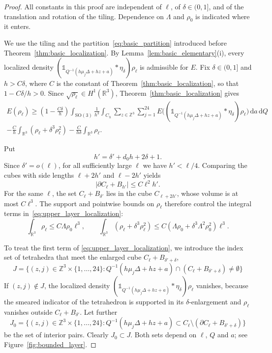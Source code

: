 \documentclass[final,reqno]{amsart}
\theoremstyle{remark}
\theoremstyle{definition}
\renewcommand{\le}{\leqslant}
\renewcommand{\ge}{\geqslant}
\newcommand{\RR}{\mathbb{R}}
\newcommand{\ZZ}{\mathbb{Z}}
\newcommand{\iden}{\mathbb{1}}
\newcommand{\tetra}{\mathbb{\Delta}}
\begin{document}
\begin{proof}
All constants in this proof are independent of $\ell$, of $\delta\in(0,1]$, and of the translation and rotation of the tiling. Dependence on $\Lambda$ and $\rho_0$ is indicated where it enters.

We use the tiling and the partition~\eqref{eq:basic_partition} introduced before Theorem~\ref{thm:basic_localization}. By Lemma~\ref{lem:basic_elementary}(i), every localized density $(\iden_{Q^{-1}(h\mu_j\tetra+h z+a)}*\eta_\delta)\rho_\ell$ is admissible for $E$. Fix $\delta\in(0,1]$ and $h>C\delta$, where $C$ is the constant of Theorem~\ref{thm:basic_localization}, so that $1-C\delta/h>0$. Since $\sqrt{\rho_\ell}\in H^1(\RR^3)$, Theorem~\ref{thm:basic_localization} gives
\begin{multline}\label{eq:upper_layer_localization}
E(\rho_\ell)\ge
\left(1-\frac{C\delta}h\right)
\int_{\mathrm{SO}(3)}\frac1{h^3}\int_{C_h}
\sum_{z\in\ZZ^3}\sum_{j=1}^{24}
E\big((\iden_{Q^{-1}(h\mu_j\tetra+h z+a)}*\eta_\delta)\rho_\ell\big)
\,\mathrm da\,\mathrm dQ
\\
-\frac{C}{h}\int_{\RR^3}(\rho_\ell+\delta^3\rho_\ell^2)
-\frac{C}{h\delta}\int_{\RR^3}\rho_\ell.
\end{multline}

Put
\[
h'=\delta'+d_0h+2\delta+1.
\]
Since $\delta'=o(\ell)$, for all sufficiently large $\ell$ we have $h'<\ell/4$. Comparing the cubes with side lengths $\ell+2h'$ and $\ell-2h'$ yields
\begin{equation}\label{eq:upper_boundary_volume}
|\partial C_\ell+B_{h'}|\le C \ell^2h'.
\end{equation}
For the same $\ell$, the set $C_\ell+B_{\delta'}$ lies in the cube $C_{\ell+2h'}$, whose volume is at most $C\ell^3$. The support and pointwise bounds on $\rho_\ell$ therefore control the integral terms in~\eqref{eq:upper_layer_localization}:
\begin{equation}\label{eq:upper_layer_integrals}
\int_{\RR^3}\rho_\ell\le C\Lambda\rho_0\ell^3,
\qquad
\int_{\RR^3}(\rho_\ell+\delta^3\rho_\ell^2)
\le C(\Lambda\rho_0+\delta^3\Lambda^2\rho_0^2)\ell^3.
\end{equation}

To treat the first term of \eqref{eq:upper_layer_localization}, we introduce the index set of tetrahedra that meet the enlarged cube $C_\ell+B_{\delta'+\delta}$,
\[
J=\big\{(z,j)\in\ZZ^3\times\{1,\dots,24\}:Q^{-1}(h\mu_j\tetra+h z+a)\cap(C_\ell+B_{\delta'+\delta})\ne\emptyset\big\}
\]
 If $(z,j)\notin J$, the localized density $(\iden_{Q^{-1}(h\mu_j\tetra+h z+a)}*\eta_\delta)\rho_\ell$ vanishes,
 because the smeared indicator of the tetrahedron is supported in its $\delta$-enlargement and $\rho_\ell$ vanishes outside
 $C_\ell+B_{\delta'}$. Let further
\[
J_0=\big\{(z,j)\in\ZZ^3\times\{1,\dots,24\}: Q^{-1}(h\mu_j\tetra+h z+a)\subset C_\ell\setminus(\partial C_\ell+B_{\delta'+\delta})\big\}
\]
be the set of interior pairs. Clearly $J_0\subset J$. Both sets depend on $\ell$, $Q$ and $a$; see Figure~\ref{fig:bounded_layer}.


\end{proof}
\end{document}
